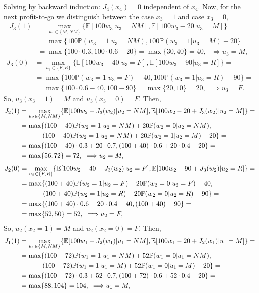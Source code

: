\documentclass[11pt, english]{article}
\begin{document}
Solving by backward induction:
$J_4(x_4)=0$ independent of $x_4$. Now, for the next profit-to-go we distinguish between the case $x_3=1$ and case $x_3=0$,
\begin{align}
	J_3(1)&=\underset{u_3\in\{M,NM\}}{\max}\{\mathbb{E}[100w_3|u_3=NM],\mathbb{E}[100w_3-20|u_3=M]\}=\\
	&=\max\{100\mathbb{P}(w_3=1|u_3=NM),100\mathbb{P}(w_3=1|u_3=M)-20\}=\\
	&=\max\{100\cdot 0.3,100\cdot 0.6 -20\}=\max\{30,40\}=40,\text{ }\Longrightarrow u_3=M,
\end{align}
\begin{align}
J_3(0)&=\underset{u_3\in\{F,R\}}{\max}\{\mathbb{E}[100w_3-40|u_3=F],\mathbb{E}[100w_3-90|u_3=R]\}=\\
&=\max\{100\mathbb{P}(w_3=1|u_3=F)-40,100\mathbb{P}(w_3=1|u_3=R)-90\}=\\
&=\max\{100\cdot 0.6-40,100 -90\}=\max\{20,10\}=20,\text{ }\Longrightarrow u_3=F.
\end{align}
So, $u_3(x_3=1)=M$ and $u_3(x_3=0)=F$. Then,
\begin{align}
		J_2(1)&=\underset{u_2\in\{M,NM\}}{\max}\{\mathbb{E}[100w_2+J_3(w_2)|u_2=NM],\mathbb{E}[100w_2-20+J_3(w_2)|u_2=M]\}=\\
	&=\max\{(100+40)\mathbb{P}(w_2=1|u_2=NM)+20\mathbb{P}(w_2=0|u_2=NM),\\
	&\hspace{12mm}(100+40)\mathbb{P}(w_2=1|u_2=NM)+20\mathbb{P}(w_2=1|u_2=M)-20\}=\\
	&=\max\{(100+40)\cdot 0.3+20\cdot 0.7,(100+40)\cdot 0.6+20\cdot 0.4 -20\}=\\
	&=\max\{56,72\}=72,\text{ }\Longrightarrow u_2=M,
\end{align}
\begin{align}
J_2(0)&=\underset{u_2\in\{F,R\}}{\max}\{\mathbb{E}[100w_2-40+J_3(w_2)|u_2=F],\mathbb{E}[100w_2-90+J_3(w_2)|u_2=R]\}=\\
&=\max\{(100+40)\mathbb{P}(w_2=1|u_2=F)+20\mathbb{P}(w_2=0|u_2=F)-40,\\
&\hspace{12mm}(100+40)\mathbb{P}(w_2=1|u_2=R)+20\mathbb{P}(w_2=0|u_2=R)-90\}=\\
&=\max\{(100+40)\cdot 0.6+20\cdot 0.4-40,(100+40) -90\}=\\
&=\max\{52,50\}=52,\text{ }\Longrightarrow u_2=F,
\end{align}
So, $u_2(x_2=1)=M$ and $u_2(x_2=0)=F$. Then,
\begin{align}
J_1(1)&=\underset{u_1\in\{M,NM\}}{\max}\{\mathbb{E}[100w_1+J_2(w_1)|u_1=NM],\mathbb{E}[100w_1-20+J_2(w_1)|u_1=M]\}=\\
&=\max\{(100+72)\mathbb{P}(w_1=1|u_1=NM)+52\mathbb{P}(w_1=0|u_1=NM),\\
&\hspace{12mm}(100+72)\mathbb{P}(w_1=1|u_1=M)+52\mathbb{P}(w_1=0|u_1=M)-20\}=\\
&=\max\{(100+72)\cdot 0.3+52\cdot 0.7,(100+72)\cdot 0.6+52\cdot 0.4 -20\}=\\
&=\max\{88,104\}=104,\text{ }\Longrightarrow u_1=M,
\end{align}
\end{document}
